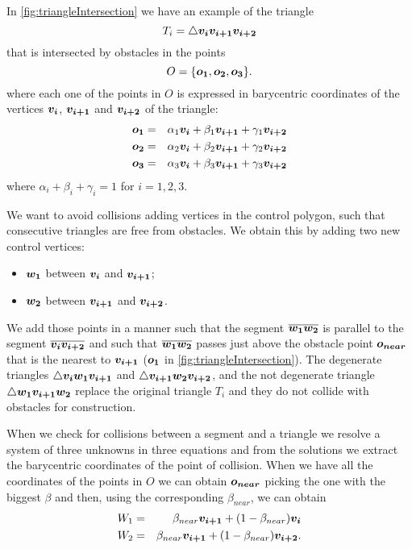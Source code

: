 \documentclass[dissertation.tex]{subfiles}
\begin{document}
In \cref{fig:triangleIntersection} we have an example of the triangle
\begin{equation*}
  T_i = \triangle \boldsymbol{v_i}\boldsymbol{v_{i+1}}\boldsymbol{v_{i+2}} 
\end{equation*}
that is
intersected by obstacles in the points
\begin{equation*}
  O = \{\boldsymbol{o_1},\boldsymbol{o_2},\boldsymbol{o_3}\}.
\end{equation*}
where each one of the points in $O$ is expressed in barycentric
coordinates of the vertices $\boldsymbol{v_i}$, $\boldsymbol{v_{i+1}}$ and $\boldsymbol{v_{i+2}}$ of the
triangle:
\begin{eqnarray*}
  \boldsymbol{o_1}&=&\alpha_1 \boldsymbol{v_i}+\beta_1 \boldsymbol{v_{i+1}}+\gamma_1 \boldsymbol{v_{i+2}}\\
  \boldsymbol{o_2}&=&\alpha_2 \boldsymbol{v_i}+\beta_2 \boldsymbol{v_{i+1}}+\gamma_2 \boldsymbol{v_{i+2}}\\
  \boldsymbol{o_3}&=&\alpha_3 \boldsymbol{v_i}+\beta_3 \boldsymbol{v_{i+1}}+\gamma_3 \boldsymbol{v_{i+2}}
\end{eqnarray*}
where $\alpha_i+\beta_i+\gamma_i=1$ for $i=1,2,3$.

We want to avoid collisions adding vertices in the control
polygon, such that consecutive triangles are free from obstacles. We
obtain this by adding two new control vertices: 
\begin{itemize}
\item $\boldsymbol{w_1}$ between $\boldsymbol{v_i}$ and $\boldsymbol{v_{i+1}}$;
\item $\boldsymbol{w_2}$ between $\boldsymbol{v_{i+1}}$ and $\boldsymbol{v_{i+2}}$.
\end{itemize}
We add those
points in a manner such that the segment $\overline{\boldsymbol{w_1}\boldsymbol{w_2}}$ is
parallel to the segment $\overline{\boldsymbol{v_i}\boldsymbol{v_{i+2}}}$ and such that
$\overline{\boldsymbol{w_1}\boldsymbol{w_2}}$ passes just above the obstacle point
$\boldsymbol{o_{near}}$ that is the nearest
to $\boldsymbol{v_{i+1}}$ ($\boldsymbol{o_1}$ in
\cref{fig:triangleIntersection}). The degenerate triangles $\triangle \boldsymbol{v_i}\boldsymbol{w_1}\boldsymbol{v_{i+1}}$ and $\triangle
\boldsymbol{v_{i+1}}\boldsymbol{w_2}\boldsymbol{v_{i+2}}$, and the not degenerate triangle
$\triangle \boldsymbol{w_1}\boldsymbol{v_{i+1}}\boldsymbol{w_2}$ replace the original triangle
$T_i$ and they do not collide with obstacles for construction.

When we check for collisions between a segment and a triangle we
resolve a system of three unknowns in
three equations and from the solutions we extract the barycentric
coordinates of
the point of collision. When we have all the coordinates of the points
in $O$ we can obtain $\boldsymbol{o_{near}}$ picking the one with the biggest $\beta$
and then, using the corresponding $\beta_{near}$, we can obtain
\begin{eqnarray*}
  W_1&=&\beta_{near} \boldsymbol{v_{i+1}}+(1-\beta_{near})\boldsymbol{v_i}\\
  W_2&=&\beta_{near} \boldsymbol{v_{i+1}}+(1-\beta_{near})\boldsymbol{v_{i+2}}.
\end{eqnarray*}
\end{document}
